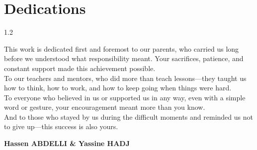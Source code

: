 \chapter*{Dedications}

\begin{spacing}{1.2}

This work is dedicated first and foremost to our parents, who carried us long before we understood what responsibility meant. Your sacrifices, patience, and constant support made this achievement possible.\\

To our teachers and mentors, who did more than teach lessons—they taught us how to think, how to work, and how to keep going when things were hard.\\

To everyone who believed in us or supported us in any way, even with a simple word or gesture, your encouragement meant more than you know.\\

And to those who stayed by us during the difficult moments and reminded us not to give up—this success is also yours.

\begin{flushright}
\textbf{Hassen ABDELLI \& Yassine HADJ}
\end{flushright}

\end{spacing}
